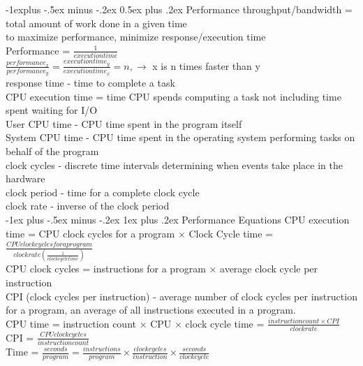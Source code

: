 \documentclass[10pt,landscape]{article}
\makeatletter
\renewcommand{\subsection}{\@startsection{subsection}{2}{0mm}%
                                {-1explus -.5ex minus -.2ex}%
                                {0.5ex plus .2ex}%
                                {\normalfont\normalsize\bfseries}}
\renewcommand{\subsubsection}{\@startsection{subsubsection}{3}{0mm}%
                                {-1ex plus -.5ex minus -.2ex}%
                                {1ex plus .2ex}%
                                {\normalfont\small\bfseries}}
\makeatother
\begin{document}
\begin{multicols}{3}
\subsection{Performance}
throughput/bandwidth = total amount of work done in a given time \\
to maximize performance, minimize response/execution time \\ 
Performance = $\frac{1}{execution time}$\\
$\frac{performance_{x}}{performance_{y}} = \frac{execution time_{y}}{execution time_{x}} = n, \rightarrow$ x is n times faster than y\\
response time - time to complete a task \\
CPU execution time = time CPU spends computing a task not including time spent waiting for I/O\\
User CPU time - CPU time spent in the program itself \\
System CPU time - CPU time spent in the operating system performing tasks on behalf of the program \\
clock cycles - discrete time intervals determining when events take place in the hardware \\ 
clock period - time for a complete clock cycle \\ 
clock rate - inverse of the clock period \\
\subsubsection{Performance Equations}
CPU execution time = CPU clock cycles for a program $\times$ Clock Cycle time = $\frac{CPU clock cycles for a program}{clock rate (\frac{1}{clock cycle time})}$\\
CPU clock cycles = instructions for a program $\times$ average clock cycle per instruction \\
CPI (clock cycles per instruction) - average number of clock cycles per instruction for a program, an average of all instructions executed in a program. \\
CPU time = instruction count $\times$ CPU $\times$ clock cycle time = $\frac{instruction count \times CPI}{clock rate}$\\
CPI = $\frac{CPU clock cycles}{instruction count}$\\
Time = $\frac{seconds}{program} =  \frac{instructions}{program} \times \frac{clock cycles}{instruction} \times \frac{seconds}{clock cycle}$


\end{multicols}
\end{document}

